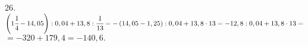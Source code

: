 26. $\left(1\cfrac{1}{4}-14,05\right):0,04+13,8:\cfrac{1}{13}=-\left(14,05-1,25\right):0,04+13,8\cdot13=
-12,8:0,04+13,8\cdot13=$\\$=-320+179,4=-140,6.$\\
